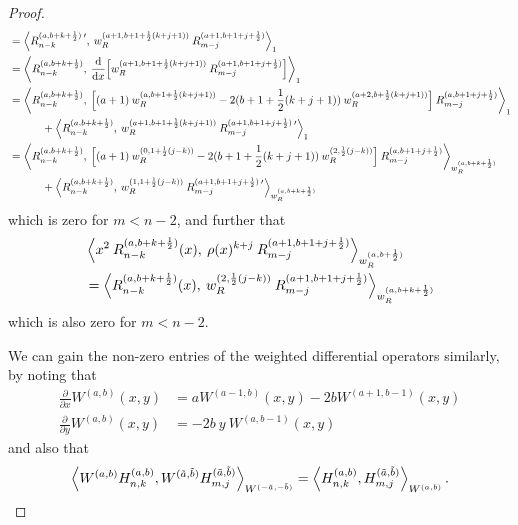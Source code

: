 \documentclass[11pt, oneside]{article}   	%
\newcommand{\half}{\frac{1}{2}}
\newcommand{\ddx}{\frac{\mathrm{d}}{\mathrm{d}x}}
\newcommand{\pddx}{\frac{\partial}{\partial x}}
\newcommand{\pddy}{\frac{\partial}{\partial y}}
\newcommand{\hdop}{H}
\newcommand{\hdopnkab}{\hdop_{n,k}^{(a,b)}}
\newcommand{\Wab}{{W^{(a,b)}}}
\newcommand{\hdopmj}{\hdop_{m,j}}
\newcommand{\genjac}{R}
\newcommand{\genjacnmk}{\genjac_{n-k}}
\newcommand{\genjacmmj}{\genjac_{m-j}}
\newcommand{\genjacw}{w_\genjac}
\begin{document}
\begin{proof}
\begin{align*}
	&= \ip<\genjacnmk^{(a, b+k+\half) \: \prime}, \: \genjacw^{(a+1, b+1+\half(k+j+1))} \: \genjacmmj^{(a+1, b+1+j+\half)} >_1 \\
	&= \ip<\genjacnmk^{(a, b+k+\half)}, \: \ddx \Big[\genjacw^{(a+1, b+1+\half(k+j+1))} \: \genjacmmj^{(a+1, b+1+j+\half)} \Big] >_1 \\
	&= \ip<\genjacnmk^{(a, b+k+\half)}, \: \Big[(a+1) \: \genjacw^{(a, b+1+\half(k+j+1))} -2(b+1+\half(k+j+1)) \: \genjacw^{(a+2, b+\half(k+j+1))} \Big] \: \genjacmmj^{(a, b+1+j+\half)} >_1 \\
		&\quad \quad \quad + \ip<\genjacnmk^{(a, b+k+\half)}, \: \genjacw^{(a+1, b+1+\half(k+j+1))} \: \genjacmmj^{(a+1, b+1+j+\half) \: \prime}>_1 \\
	&= \ip<\genjacnmk^{(a, b+k+\half)}, \: \Big[(a+1) \: \genjacw^{(0,1+\half(j-k))} -2(b+1+\half(k+j+1)) \: \genjacw^{(2, \half(j-k))} \Big] \: \genjacmmj^{(a, b+1+j+\half)} >_{\genjacw^{(a, b+k+\half)}} \\
		&\quad \quad \quad + \ip<\genjacnmk^{(a, b+k+\half)}, \: \genjacw^{(1, 1+\half(j-k))} \: \genjacmmj^{(a+1, b+1+j+\half) \: \prime}>_{\genjacw^{(a, b+k+\half)}}
\end{align*}
which is zero for $m < n - 2$, and further that
\begin{align*}
	&\ip< x^2 \: \genjacnmk^{(a, b+k+\half)}(x), \: \rho(x)^{k+j} \: \genjacmmj^{(a+1, b+1+j+\half)} >_{\genjacw^{(a, b+\half)}} \\
	&= \ip< \genjacnmk^{(a, b+k+\half)}(x), \: \genjacw^{(2, \half(j-k))} \: \genjacmmj^{(a+1, b+1+j+\half)} >_{\genjacw^{(a, b+k+\half)}}
\end{align*}
which is also zero for $m < n - 2$.

We can gain the non-zero entries of the weighted differential operators similarly, by noting that
\begin{align}
	\pddx \Wab(x,y) &= a W^{(a-1, b)}(x,y) - 2bW^{(a+1, b-1)}(x,y) \label{eqn:weightderivativex} \\
	\pddy \Wab(x,y) &= -2b \: y \: W^{(a, b-1)}(x,y) \label{eqn:weightderivativey}
\end{align}
and also that
\begin{align*}
	\ip< \Wab \hdopnkab, W^{(\tilde{a},\tilde{b})} \hdopmj^{(\tilde{a},\tilde{b})} >_{W^{(-\tilde{a},-\tilde{b})}} = \ip< \hdopnkab, \hdopmj^{(\tilde{a},\tilde{b})} >_\Wab.
\end{align*}

\end{proof}
\end{document}
